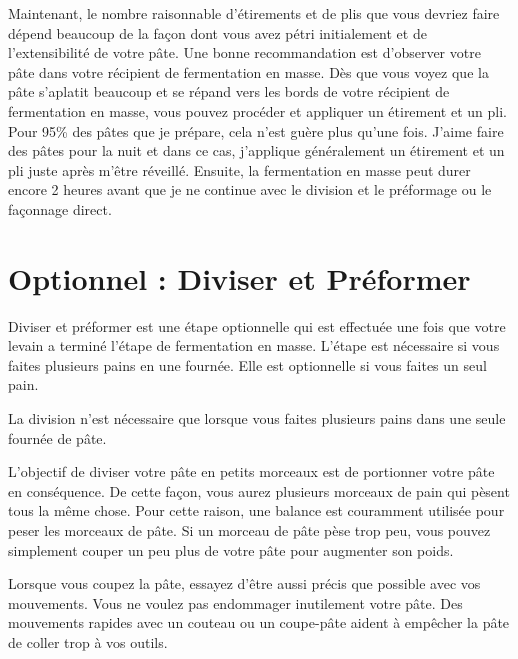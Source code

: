 Maintenant, le nombre raisonnable d'étirements et de plis que vous devriez faire dépend beaucoup de la façon dont vous
avez pétri initialement et de l'extensibilité de votre pâte. Une bonne recommandation est
d'observer votre pâte dans votre récipient de fermentation en masse. Dès que vous voyez que la pâte
s'aplatit beaucoup et se répand vers les bords de votre récipient de fermentation en masse,
vous pouvez procéder et appliquer un étirement et un pli. Pour 95\% des pâtes
que je prépare, cela n'est guère plus qu'une fois. J'aime faire des pâtes pour la nuit
et dans ce cas, j'applique généralement un étirement et un pli juste après
m'être réveillé. Ensuite, la fermentation en masse peut durer encore 2 heures avant que je ne continue
avec le division et le préformage ou le façonnage direct.

\section{Optionnel : Diviser et Préformer}

Diviser et préformer est une étape optionnelle qui est effectuée
une fois que votre levain a terminé l'étape de fermentation en masse.
L'étape est nécessaire si vous faites plusieurs pains en une
fournée. Elle est optionnelle si vous faites un seul pain.

\begin{flowchart}[!htb]
\begin{center}
  
  \caption[Arbre de décision pour la division]{La division n'est nécessaire que lorsque vous 
      faites plusieurs pains dans une seule fournée de pâte.}%
  \label{fig:dividing-decision-tree}
\end{center}
\end{flowchart}

L'objectif de diviser votre pâte en petits morceaux est de portionner
votre pâte en conséquence. De cette façon, vous aurez plusieurs morceaux de pain
qui pèsent tous la même chose. Pour cette raison, une balance est couramment
utilisée pour peser les morceaux de pâte. Si un morceau de pâte pèse
trop peu, vous pouvez simplement couper un peu plus de votre pâte
pour augmenter son poids.

Lorsque vous coupez la pâte, essayez d'être aussi précis que possible avec vos
mouvements. Vous ne voulez pas endommager inutilement votre pâte. 
Des mouvements rapides avec un couteau ou un coupe-pâte aident à empêcher la
pâte de coller trop à vos outils.

